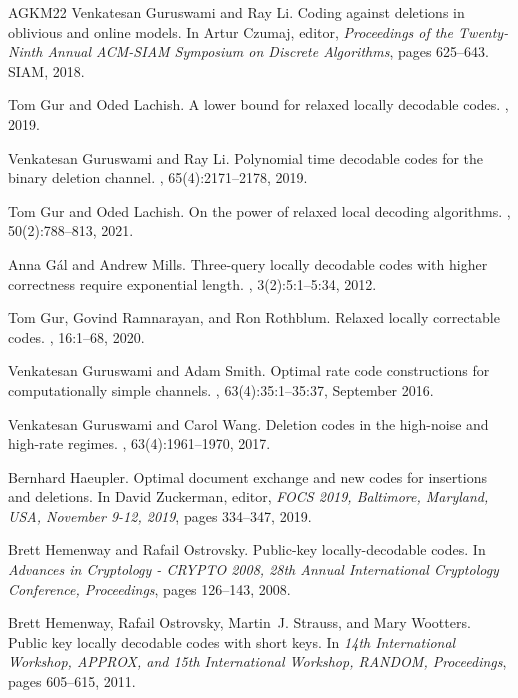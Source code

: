 \documentclass[10pt,a4paper]{article}
\theoremstyle{remark}
\begin{document}
\begin{thebibliography}{AGKM22}
Venkatesan Guruswami and Ray Li.
\newblock Coding against deletions in oblivious and online models.
\newblock In Artur Czumaj, editor, {\em Proceedings of the Twenty-Ninth Annual
  {ACM-SIAM} Symposium on Discrete Algorithms}, pages 625--643. {SIAM}, 2018.

Tom Gur and Oded Lachish.
\newblock A lower bound for relaxed locally decodable codes.
, 2019.

Venkatesan Guruswami and Ray Li.
\newblock Polynomial time decodable codes for the binary deletion channel.
, 65(4):2171--2178, 2019.

Tom Gur and Oded Lachish.
\newblock On the power of relaxed local decoding algorithms.
, 50(2):788--813, 2021.

Anna G{\'{a}}l and Andrew Mills.
\newblock Three-query locally decodable codes with higher correctness require
  exponential length.
, 3(2):5:1--5:34, 2012.

Tom Gur, Govind Ramnarayan, and Ron Rothblum.
\newblock Relaxed locally correctable codes.
, 16:1--68, 2020.

Venkatesan Guruswami and Adam Smith.
\newblock Optimal rate code constructions for computationally simple channels.
, 63(4):35:1--35:37, September 2016.

Venkatesan Guruswami and Carol Wang.
\newblock Deletion codes in the high-noise and high-rate regimes.
, 63(4):1961--1970,
  2017.

Bernhard Haeupler.
\newblock Optimal document exchange and new codes for insertions and deletions.
\newblock In David Zuckerman, editor, {\em {FOCS} 2019, Baltimore, Maryland,
  USA, November 9-12, 2019}, pages 334--347, 2019.

Brett Hemenway and Rafail Ostrovsky.
\newblock Public-key locally-decodable codes.
\newblock In {\em Advances in Cryptology - {CRYPTO} 2008, 28th Annual
  International Cryptology Conference, Proceedings}, pages 126--143, 2008.

Brett Hemenway, Rafail Ostrovsky, Martin~J. Strauss, and Mary Wootters.
\newblock Public key locally decodable codes with short keys.
\newblock In {\em 14th International Workshop, {APPROX}, and 15th International
  Workshop, {RANDOM}, Proceedings}, pages 605--615, 2011.


\end{thebibliography}
\end{document}
